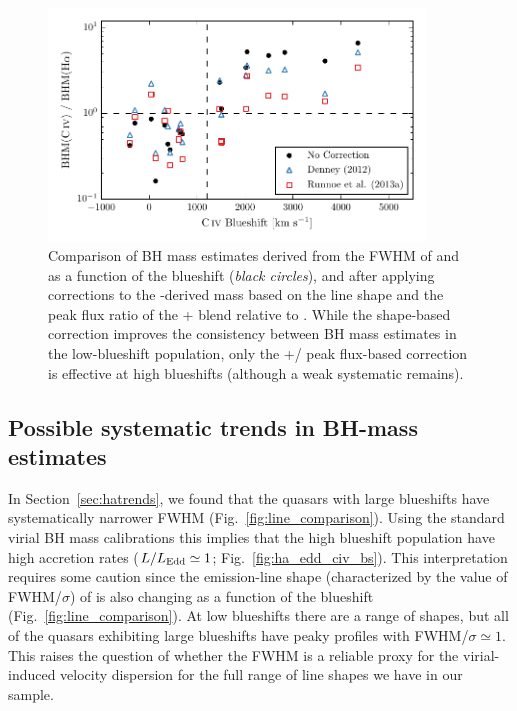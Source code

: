 \begin{figure}
    \includegraphics[width=10cm]{figures/chapter02/corrections.pdf}
    \caption{Comparison of BH mass estimates derived from the FWHM of  and \ha as a function of the  blueshift (\textit{black circles}), and after applying corrections to the -derived mass based on the line shape \citep[\textit{blue triangles};][]{denney12} and the peak flux ratio of the + blend relative to  \citep[\textit{red squares};][]{runnoe13}. While the shape-based correction improves the consistency between BH mass estimates in the low-blueshift population, only the +/ peak flux-based correction is effective at high blueshifts (although a weak systematic remains).}
    \label{fig:corrections}
\end{figure}

\subsection{Possible systematic trends in \ha BH-mass estimates}

In Section~\ref{sec:hatrends}, we found that the quasars with large  blueshifts have systematically narrower \ha FWHM (Fig.~\ref{fig:line_comparison}).
Using the standard virial BH mass calibrations this implies that the high  blueshift population have high accretion rates ($L/L_{\rm Edd} \simeq 1$; Fig.~\ref{fig:ha_edd_civ_bs}). 
This interpretation requires some caution since the emission-line shape (characterized by the value of FWHM/$\sigma$) of \ha is also changing as a function of the  blueshift (Fig.~\ref{fig:line_comparison}). 
At low  blueshifts there are a range of shapes, but all of the quasars exhibiting large  blueshifts have peaky \ha profiles with FWHM/$\sigma \simeq 1$. 
This raises the question of whether the \ha FWHM is a reliable proxy for the virial-induced velocity dispersion for the full range of \ha line shapes we have in our sample. 

